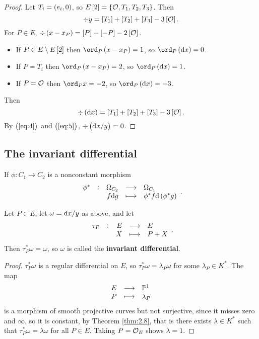 \begin{proof}
Let $ T_i = \br{e_i, 0} $, so $ E\sbr{2} = \cbr{\OOO, T_1, T_2, T_3} $. Then
\begin{equation}
\label{eq:4}
\div y = \sbr{T_1} + \sbr{T_2} + \sbr{T_3} - 3\sbr{\OOO}.
\end{equation}
For $ P \in E $, $ \div \br{x - x_P} = \sbr{P} + \sbr{-P} - 2\sbr{\OOO} $.
\begin{itemize}
\item If $ P \in E \setminus E\sbr{2} $ then $ \ord_P \br{x - x_P} = 1 $, so $ \ord_P \br{\d x} = 0 $.
\item If $ P = T_i $ then $ \ord_P \br{x - x_P} = 2 $, so $ \ord_P \br{\d x} = 1 $.
\item If $ P = \mathcal{O} $ then $ \ord_P x = -2 $, so $ \ord_P \br{\d x} = -3 $.
\end{itemize}
Then
\begin{equation}
\label{eq:5}
\div \br{\d x} = \sbr{T_1} + \sbr{T_2} + \sbr{T_3} - 3\sbr{\OOO}.
\end{equation}
By $ \br{\ref{eq:4}} $ and $ \br{\ref{eq:5}} $, $ \div \br{\d x / y} = 0 $.
\end{proof}

\pagebreak

\subsection{The invariant differential}

\begin{definition*}
If $ \phi : C_1 \to C_2 $ is a nonconstant morphism
$$ \function[\phi^*]{\Omega_{C_2}}{\Omega_{C_1}}{f\d g}{\phi^*f\d\br{\phi^*g}}. $$
\end{definition*}

\begin{lemma}
\label{lem:6.2}
Let $ P \in E $, let $ \omega = \mathrm{d} x / y $ as above, and let
$$ \function[\tau_P]{E}{E}{X}{P + X}. $$
Then $ \tau_P^*\omega = \omega $, so $ \omega $ is called the \textbf{invariant differential}.
\end{lemma}

\begin{proof}
$ \tau_P^*\omega $ is a regular differential on $ E $, so $ \tau_P^*\omega = \lambda_P\omega $ for some $ \lambda_P \in K^* $. The map
$$ \function{E}{\PP^1}{P}{\lambda_P} $$
is a morphism of smooth projective curves but not surjective, since it misses zero and $ \infty $, so it is constant, by Theorem \ref{thm:2.8}, that is there exists $ \lambda \in K^* $ such that $ \tau_P^*\omega = \lambda\omega $ for all $ P \in E $. Taking $ P = \mathcal{O}_E $ shows $ \lambda = 1 $.
\end{proof}

